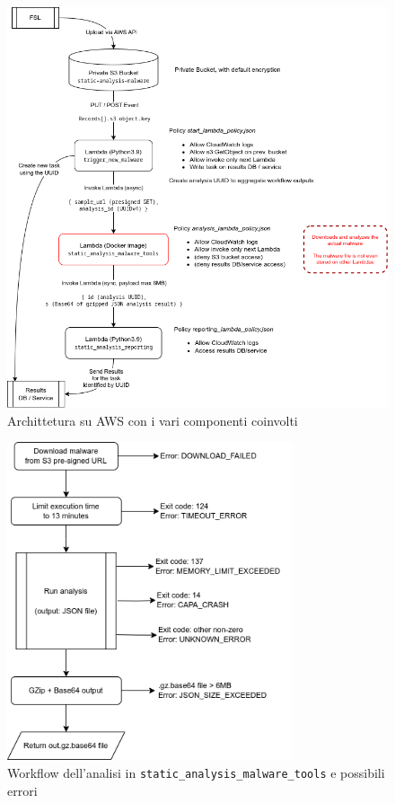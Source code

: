 \begin{figure}[htbp]
    \centering
    \includegraphics[width=\textwidth]{assets/aws_static_lambdas_architecture.png}
    \caption{Archittetura su AWS con i vari componenti coinvolti}
    \label{fig:aws_static_lambdas_architecture}
\end{figure}

\begin{figure}[htbp]
    \centering
    \includegraphics[width=0.75\textwidth]{assets/docker_static_analysis_flow.png}
    \caption{Workflow dell'analisi in \texttt{static\_analysis\_malware\_tools} e possibili errori}
    \label{fig:tools_workflow_static_analysis}
\end{figure}

